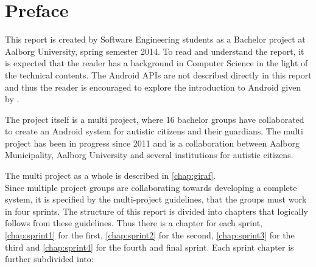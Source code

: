\newcommand{\headerPreface}{Preface}
\cleardoublepage
{}
\pdfbookmark{\headerPreface}{chap:preface}
\chapter*{\headerPreface}\label{chap:preface}












This report is created by Software Engineering students as a Bachelor project at Aalborg University, spring semester 2014.
To read and understand the report, it is expected that the reader has a background in Computer Science in the light of the technical contents.
The Android APIs are not described directly in this report and thus the reader is encouraged to explore the introduction to Android given by \citet{androidIntroduction}.

The project itself is a multi project, where 16 bachelor groups have collaborated to create an Android system for autistic citizens and their guardians.
The multi project has been in progress since 2011 and is a collaboration between Aalborg Municipality, Aalborg University and several institutions for autistic citizens.

The multi project as a whole is described in \cref{chap:giraf}.\\

Since multiple project groups are collaborating towards developing a complete system, it is specified by the multi-project guidelines, that the groups must work in four sprints.
The structure of this report is divided into chapters that logically follows from these guidelines.
Thus there is a chapter for each sprint, \cref{chap:sprint1} for the first, \cref{chap:sprint2} for the second, \cref{chap:sprint3} for the third and \cref{chap:sprint4} for the fourth and final sprint.
Each sprint chapter is further subdivided into:

